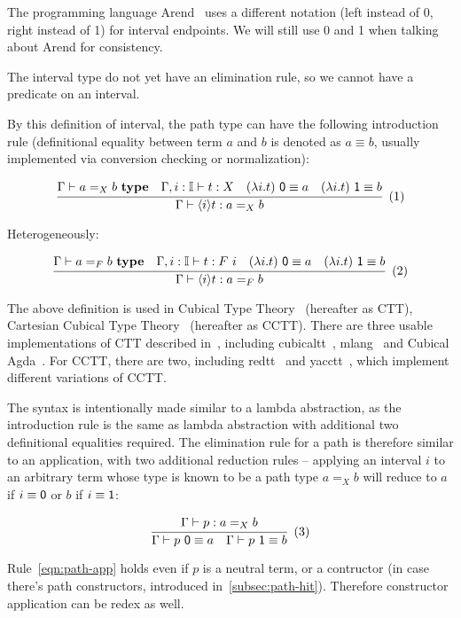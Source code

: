 The programming language Arend~\cite{Arend} uses a different notation
(\textsf{left} instead of \textsf 0, \textsf{right} instead of \textsf 1)
for interval endpoints.
We will still use \textsf 0 and \textsf 1 when talking
about Arend for consistency.

The interval type do not yet have an elimination rule,
so we cannot have a predicate on an interval.

By this definition of interval, the path type can
have the following introduction rule
(definitional equality between term $a$ and $b$
is denoted as $a \equiv b$,
usually implemented via conversion checking or normalization):

\[
  \cfrac{
    \Gamma \vdash a =_X b \ \textbf{type}
    \quad
    \Gamma, i : \mathbb I \vdash t : X
    \quad
    (\lambda i. t) \ \textsf 0 \equiv a
    \quad
    (\lambda i. t) \ \textsf 1 \equiv b
  }{
    \Gamma \vdash \lrangle i t : a =_X b
  }
  \xtag
\]

Heterogeneously:

\[
  \cfrac{
    \Gamma \vdash a =_F b \ \textbf{type}
    \quad
    \Gamma, i : \mathbb I \vdash t : F \ i
    \quad
    (\lambda i. t) \ \textsf 0 \equiv a
    \quad
    (\lambda i. t) \ \textsf 1 \equiv b
  }{
    \Gamma \vdash \lrangle i t : a =_F b
  }
  \xtag
\]

The above definition is used in Cubical Type Theory~\cite{CCHM,CHM}
(hereafter as CTT), Cartesian Cubical Type
Theory~\cite{CCTT,CCTT2,CHTT} (hereafter as CCTT).
There are three usable implementations of CTT described in~\cite{CHM},
including cubicaltt~\cite{CubicalTT},
mlang~\cite{Mlang} and Cubical Agda~\cite{CubicalAgda}.
For CCTT, there are two, including
redtt~\cite{RedTT} and yacctt~\cite{YaccTT},
which implement different variations of CCTT.

The syntax is intentionally made similar to a lambda abstraction,
as the introduction rule is the same as lambda abstraction with
additional two definitional equalities required.
The elimination rule for a path is therefore similar to an application,
with two additional reduction rules -- applying an interval $i$ to
an arbitrary term whose type is known to be a path type $a =_X b$
will reduce to $a$ if $i \equiv \textsf 0$ or $b$ if $i \equiv \textsf 1$:

\[
  \cfrac{
    \Gamma \vdash p : a =_X b
  }{
    \Gamma \vdash p\ \textsf 0 \equiv a
    \quad
    \Gamma \vdash p\ \textsf 1 \equiv b
  }
  \xtag \label{eqn:path-app}
\]

Rule~\ref{eqn:path-app} holds even if $p$ is a neutral term,
or a contructor (in case there's path constructors,
introduced in~\cref{subsec:path-hit}).
Therefore constructor application can be redex as well.

